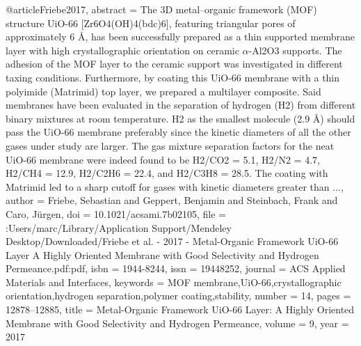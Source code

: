 @article{Friebe2017,
abstract = {The 3D metal–organic framework (MOF) structure UiO-66 [Zr6O4(OH)4(bdc)6], featuring triangular pores of approximately 6 {\AA}, has been successfully prepared as a thin supported membrane layer with high crystallographic orientation on ceramic $\alpha$-Al2O3 supports. The adhesion of the MOF layer to the ceramic support was investigated in different taxing conditions. Furthermore, by coating this UiO-66 membrane with a thin polyimide (Matrimid) top layer, we prepared a multilayer composite. Said membranes have been evaluated in the separation of hydrogen (H2) from different binary mixtures at room temperature. H2 as the smallest molecule (2.9 {\AA}) should pass the UiO-66 membrane preferably since the kinetic diameters of all the other gases under study are larger. The gas mixture separation factors for the neat UiO-66 membrane were indeed found to be H2/CO2 = 5.1, H2/N2 = 4.7, H2/CH4 = 12.9, H2/C2H6 = 22.4, and H2/C3H8 = 28.5. The coating with Matrimid led to a sharp cutoff for gases with kinetic diameters greater than ...},
author = {Friebe, Sebastian and Geppert, Benjamin and Steinbach, Frank and Caro, J{\"{u}}rgen},
doi = {10.1021/acsami.7b02105},
file = {:Users/marc/Library/Application Support/Mendeley Desktop/Downloaded/Friebe et al. - 2017 - Metal-Organic Framework UiO-66 Layer A Highly Oriented Membrane with Good Selectivity and Hydrogen Permeance.pdf:pdf},
isbn = {1944-8244},
issn = {19448252},
journal = {ACS Applied Materials and Interfaces},
keywords = {MOF membrane,UiO-66,crystallographic orientation,hydrogen separation,polymer coating,stability},
number = {14},
pages = {12878--12885},
title = {{Metal-Organic Framework UiO-66 Layer: A Highly Oriented Membrane with Good Selectivity and Hydrogen Permeance}},
volume = {9},
year = {2017}
}
